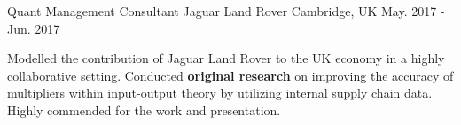 \begin{cventries}
  \cventry
    {Quant Management Consultant} %
    {Jaguar Land Rover} %
    {Cambridge, UK} %
    {May. 2017 - Jun. 2017} %
    {
      \begin{cvitems} %
        \item {Modelled the contribution of Jaguar Land Rover to the UK economy in a highly collaborative setting. Conducted \textbf{original research} on improving the accuracy of multipliers within input-output theory by utilizing internal supply chain data. Highly commended for the work and presentation.}
      \end{cvitems}
    }

\end{cventries}
